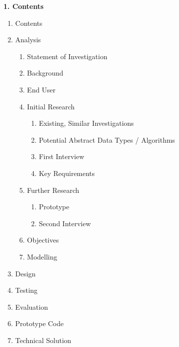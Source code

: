 \documentclass{article}
\begin{document}
\begin{flushleft}
    \huge
    \textbf{1. Contents}
    
    \Large
    \begin{enumerate}
        \item Contents
        \item Analysis
            \begin{enumerate}
                \item Statement of Investigation
                \item Background
                \item End User
                \item Initial Research
                    \begin{enumerate}
                        \item Existing, Similar Investigations
                        \item Potential Abstract Data Types / Algorithms
                        \item First Interview
                        \item Key Requirements
                    \end{enumerate}
                \item Further Research
                    \begin{enumerate}
                        \item Prototype
                        \item Second Interview
                    \end{enumerate}
                \item Objectives
                \item Modelling
            \end{enumerate}
        \item Design
        \item Testing
        \item Evaluation
        \item Prototype Code
        \item Technical Solution
    \end{enumerate}
    
    \pagebreak
\end{flushleft}












\end{document}

